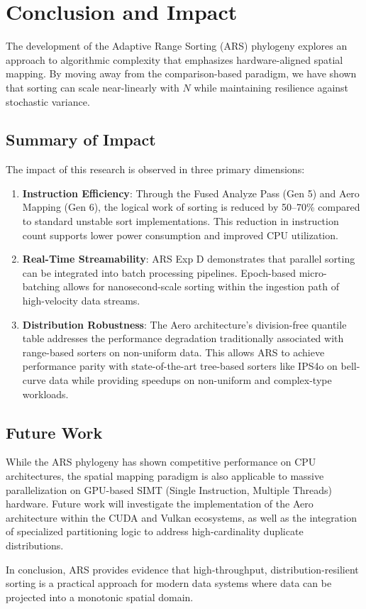 \section{Conclusion and Impact}
The development of the Adaptive Range Sorting (ARS) phylogeny explores an approach to algorithmic complexity that emphasizes hardware-aligned spatial mapping. By moving away from the comparison-based paradigm, we have shown that sorting can scale near-linearly with $N$ while maintaining resilience against stochastic variance.

\subsection{Summary of Impact}
The impact of this research is observed in three primary dimensions:
\begin{enumerate}
    \item \textbf{Instruction Efficiency}: Through the Fused Analyze Pass (Gen 5) and Aero Mapping (Gen 6), the logical work of sorting is reduced by 50--70\% compared to standard unstable sort implementations. This reduction in instruction count supports lower power consumption and improved CPU utilization.
    \item \textbf{Real-Time Streamability}: ARS Exp D demonstrates that parallel sorting can be integrated into batch processing pipelines. Epoch-based micro-batching allows for nanosecond-scale sorting within the ingestion path of high-velocity data streams.
    \item \textbf{Distribution Robustness}: The Aero architecture's division-free quantile table addresses the performance degradation traditionally associated with range-based sorters on non-uniform data. This allows ARS to achieve performance parity with state-of-the-art tree-based sorters like IPS4o on bell-curve data while providing speedups on non-uniform and complex-type workloads.
    \end{enumerate}

    \subsection{Future Work}
    While the ARS phylogeny has shown competitive performance on CPU architectures, the spatial mapping paradigm is also applicable to massive parallelization on GPU-based SIMT (Single Instruction, Multiple Threads) hardware. Future work will investigate the implementation of the Aero architecture within the CUDA and Vulkan ecosystems, as well as the integration of specialized partitioning logic to address high-cardinality duplicate distributions.

    In conclusion, ARS provides evidence that high-throughput, distribution-resilient sorting is a practical approach for modern data systems where data can be projected into a monotonic spatial domain.

